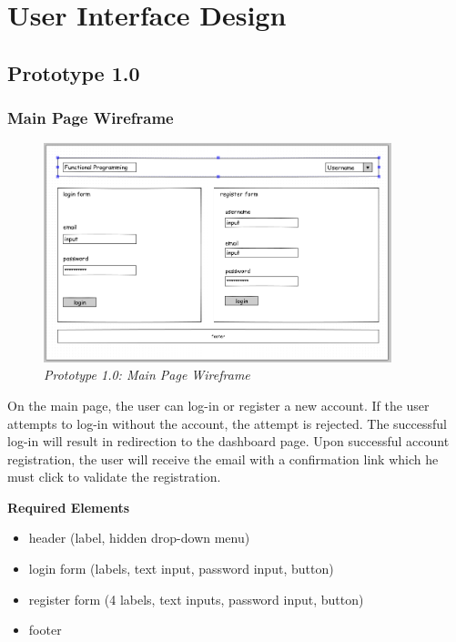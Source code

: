 \documentclass[12pt,twoside,a4paper]{report}
\begin{document}
\section{User Interface Design}\label{3.7}

\subsection{Prototype 1.0}\label{3.7.1}

\subsubsection{Main Page Wireframe}\label{3.7.1.1}
\begin{figure}[!ht]
	\centering
		\includegraphics[width=0.9\textwidth, totalheight=7cm]
		{wireframe_main_page}
	\caption{\textit{Prototype 1.0: Main Page Wireframe}}
	\label{f3.7.1.1}
\end{figure}

On the main page, the user can log-in or register a new account. If the user attempts to log-in without the account, the attempt is rejected. The successful log-in will result in redirection to the dashboard page. Upon successful account registration, the user will receive the email with a confirmation link which he must click to validate the registration.

\textbf{Required Elements}
\begin{itemize}
\item header (label, hidden drop-down menu)
\item login form (labels, text input, password input, button)
\item register form (4 labels, text inputs, password input, button)
\item footer
\end{itemize}
\end{document}
